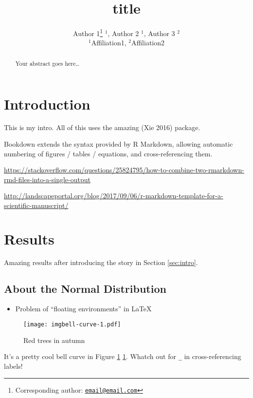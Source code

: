 \documentclass[12pt,]{article}
\title{title}
\author{Author 1\footnote{Corresponding author:
  \href{mailto:email@email.com}{\nolinkurl{email@email.com}}} \(^1\),
Author 2 \(^1\), Author 3 \(^2\)\\
\(^1\)Affiliation1, \(^2\)Affiliation2}
\date{}
\providecommand{\tightlist}{%
  \setlength{\itemsep}{0pt}\setlength{\parskip}{0pt}}
\begin{document}
\maketitle
\begin{abstract}
Your abstract goes here\ldots{}
\end{abstract}

\newpage

\section{Introduction}\label{introduction}

\label{sec:intro}

This is my intro. All of this uses the amazing (Xie 2016) package.

Bookdown extends the syntax provided by R Markdown, allowing automatic
numbering of figures / tables / equations, and cross-referencing them.

\url{https://stackoverflow.com/questions/25824795/how-to-combine-two-rmarkdown-rmd-files-into-a-single-output}

\url{http://landscapeportal.org/blog/2017/09/06/r-markdown-template-for-a-scientific-manuscript/}

\section{Results}\label{results}

\label{sec:res}

Amazing results after introducing the story in Section \ref{sec:intro}.

\subsection{About the Normal
Distribution}\label{about-the-normal-distribution}

\label{sec:res-trees}

\begin{itemize}
\tightlist
\item
  Problem of ``floating environments'' in LaTeX
\end{itemize}

\begin{figure}
\centering
\texttt{[image: imgbell-curve-1.pdf]}
\caption{\label{fig:bell-curve}Red trees in autumn}
\end{figure}

It's a pretty cool bell curve in Figure \ref{fig:bell-curve}
\ref{fig:bell-curve}. Whatch out for \texttt{\_} in cross-referencing
labels!
\end{document}
